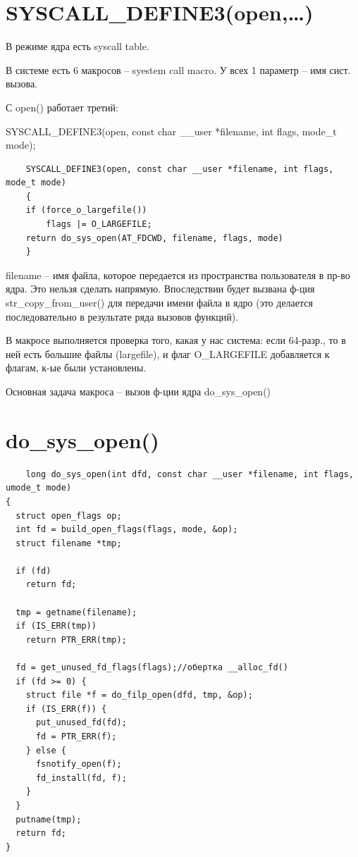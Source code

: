\section{SYSCALL\_DEFINE3(open,…)}
В режиме ядра есть syscall table.

В системе есть 6 макросов -- syestem call macro. У всех 1 параметр -- имя сист. вызова.

С open() работает третий:

SYSCALL\_DEFINE3(open, const char \_\_user *filename, int flags, mode\_t mode);

\begin{lstlisting}
    SYSCALL_DEFINE3(open, const char __user *filename, int flags, mode_t mode)
    {
    if (force_o_largefile())
        flags |= O_LARGEFILE;
    return do_sys_open(AT_FDCWD, filename, flags, mode)
    }
\end{lstlisting}

filename -- имя файла, которое передается из пространства пользователя в пр-во ядра. Это нельзя сделать напрямую. Впоследствии будет вызвана ф-ция str\_copy\_from\_user() для передачи имени файла в ядро (это делается последовательно в результате ряда вызовов функций).

В макросе выполняется проверка того, какая у нас система: если 64-разр., то в ней есть большие файлы (largefile), и флаг O\_LARGEFILE добавляется к флагам, к-ые были установлены.

Основная задача макроса -- вызов ф-ции ядра do\_sys\_open()

\section{do\_sys\_open()}
\begin{lstlisting}
    long do_sys_open(int dfd, const char __user *filename, int flags, umode_t mode)
{
  struct open_flags op;
  int fd = build_open_flags(flags, mode, &op);
  struct filename *tmp;

  if (fd)
    return fd;

  tmp = getname(filename);
  if (IS_ERR(tmp))
    return PTR_ERR(tmp);

  fd = get_unused_fd_flags(flags);//обертка __alloc_fd()
  if (fd >= 0) {
    struct file *f = do_filp_open(dfd, tmp, &op);
    if (IS_ERR(f)) {
      put_unused_fd(fd);
      fd = PTR_ERR(f);
    } else {
      fsnotify_open(f);
      fd_install(fd, f);
    }
  }
  putname(tmp);
  return fd;
}
\end{lstlisting}

